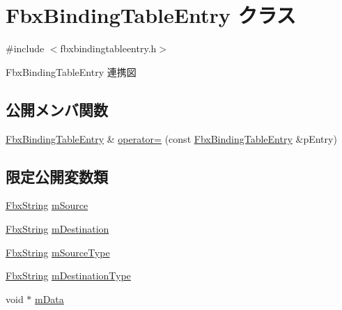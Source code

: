 \hypertarget{class_fbx_binding_table_entry}{}\section{Fbx\+Binding\+Table\+Entry クラス}
\label{class_fbx_binding_table_entry}


{\ttfamily \#include $<$fbxbindingtableentry.\+h$>$}



Fbx\+Binding\+Table\+Entry 連携図
\subsection*{公開メンバ関数}
\begin{DoxyCompactItemize}
\item 
\hyperlink{class_fbx_binding_table_entry}{Fbx\+Binding\+Table\+Entry} \& \hyperlink{class_fbx_binding_table_entry_ae1019a3507f988ab66e09adb93326ae4}{operator=} (const \hyperlink{class_fbx_binding_table_entry}{Fbx\+Binding\+Table\+Entry} \&p\+Entry)
\end{DoxyCompactItemize}
\subsection*{限定公開変数類}
\begin{DoxyCompactItemize}
\item 
\hyperlink{class_fbx_string}{Fbx\+String} \hyperlink{class_fbx_binding_table_entry_a9fe2b8742a77e290a15287b4dbc1df74}{m\+Source}
\item 
\hyperlink{class_fbx_string}{Fbx\+String} \hyperlink{class_fbx_binding_table_entry_adf7efee81ae6e2f07a52e112f8345df9}{m\+Destination}
\item 
\hyperlink{class_fbx_string}{Fbx\+String} \hyperlink{class_fbx_binding_table_entry_ad2f8a7934ffbeb6eb7bc83fa5f5e8d06}{m\+Source\+Type}
\item 
\hyperlink{class_fbx_string}{Fbx\+String} \hyperlink{class_fbx_binding_table_entry_a569eeb447b060f779b4dced59c962af8}{m\+Destination\+Type}
\item 
void $\ast$ \hyperlink{class_fbx_binding_table_entry_a2fd0df2140365960261ac038b797f0f3}{m\+Data}
\end{DoxyCompactItemize}
